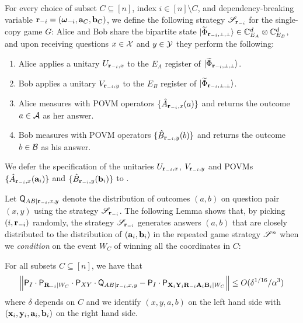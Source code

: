 For every choice of subset $C \subseteq [n]$, index  $i \in [n] \setminus C$, and dependency-breaking variable $\mathbf{r}_{-i} = ({\boldsymbol{\omega}}_{-i},\mathbf{a}_C,\mathbf{b}_C)$, we define the following strategy $\mathscr{S}_{\mathbf{r}_{-i}}$ for the single-copy game $G$: Alice and Bob share the bipartite state $\ket{\wt{\Phi}_\sspp} \in \C_{E_A}^d \otimes \C_{E_B}^d$, and 
upon receiving questions $x \in \mathcal{X}$ and $y \in \mathcal{Y}$ they perform the following:
\begin{enumerate}
	\item Alice applies a unitary $U_{\mathbf{r}_{-i},x}$ to the $E_A$ register of $\ket{\wt{\Phi}_\sspp}$.
	\item Bob applies a unitary $V_{\mathbf{r}_{-i},y}$ to the $E_B$ register of $\ket{\wt{\Phi}_\sspp}$.
	\item Alice measures with POVM operators $\{\hat{A}_{\mathbf{r}_{-i},x}(a) \}$ and returns the outcome $a \in \mathcal{A}$ as her answer.
	\item Bob measures with POVM operators $\{\hat{B}_{\mathbf{r}_{-i},y}(b)\}$ and returns the outcome $b \in \mathcal{B}$ as his answer.
\end{enumerate}
We defer the specification of the unitaries $U_{\mathbf{r}_{-i},x}$, $V_{\mathbf{r}_{-i},y}$ and POVMs $\{\hat{A}_{\mathbf{r}_{-i},x}(\mathbf{a}_i) \}$ and $\{\hat{B}_{\mathbf{r}_{-i}, y}(\mathbf{b}_i)\}$ to .

Let $\mathsf{Q}_{A B | \mathbf{r}_{-i}, x,y}$ denote the distribution of outcomes $(a,b)$ on question pair $(x,y)$ using the strategy $\mathscr{S}_{\mathbf{r}_{-i}}$. The following Lemma shows that, by picking $(i,\mathbf{r}_{-i})$ randomly, the strategy $\mathscr{S}_{\mathbf{r}_{-i}}$ generates answers $(a,b)$ that are closely distributed to the distribution of $(\mathbf{a}_i,\mathbf{b}_i)$ in the repeated game strategy $\mathscr{S}^n$ when we \emph{condition} on the event $W_C$ of winning all the coordinates in $C$:

\begin{lemma}
\label{lem:anchorpr_main_lemma}
For all subsets $C \subseteq [n]$, we have that
\[
	\Big \| \mathsf{P}_I \cdot \mathsf{P}_{\mathbf{R}_{-i} | W_C} \cdot \mathsf{P}_{XY} \cdot \mathsf{Q}_{AB | \mathbf{r}_{-i}, x,y} - \mathsf{P}_I \cdot \mathsf{P}_{\mathbf{X}_i \mathbf{Y}_i \mathbf{R}_{-i} \mathbf{A}_i \mathbf{B}_i | W_C} \Big \| \leq O(\delta^{1/16}/\alpha^3)
\]
where $\delta$ depends on $C$ and we identify $(x,y,a,b)$ on the left hand side with $(\mathbf{x}_i,\mathbf{y}_i,\mathbf{a}_i,\mathbf{b}_i)$ on the right hand side.
\end{lemma}

